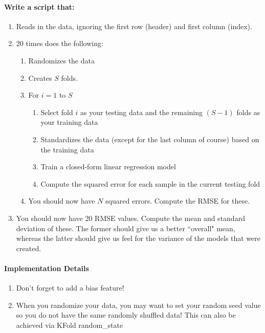 \documentclass[12pt]{article}
\begin{document}
\paragraph{Write a script that:}
\begin{enumerate}
	\item Reads in the data, ignoring the first row (header) and first column (index).
	\item 20 times does the following:
	\begin{enumerate}
		\item Randomizes the data
		\item Creates $S$ folds.
  		\item For $i=1$ to $S$
	  	\begin{enumerate}
  			\item Select fold $i$ as your testing data and the remaining $(S-1)$ folds as your training data
			\item Standardizes the data (except for the last column of course) based on the training data
			\item Train a closed-form linear regression model
		  	\item Compute the squared error for each sample in the current testing fold
		\end{enumerate}
		\item You should now have $N$ squared errors.  Compute the RMSE for these.  
	\end{enumerate}
	\item You should now have 20 RMSE values.  Compute the mean and standard deviation of these.  The former should give us a better ``overall" mean, whereas the latter should give us feel for the variance of the models that were created.
\end{enumerate}


\paragraph{Implementation Details}
\begin{enumerate}
\item Don't forget to add a bias feature!
\item When you randomize your data, you may want to set your random seed value so you do not have the same randomly shuffled data!  This can also be achieved via KFold random\_state
\end{enumerate}
\end{document}
